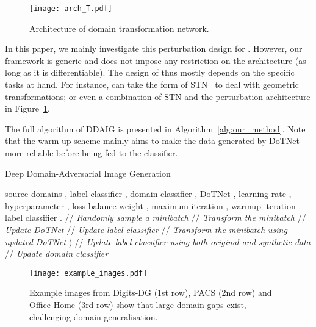 \documentclass[letterpaper]{article}
\begin{document}
\begin{figure}[t]
    \centering
    \texttt{[image: arch\_T.pdf]}
    \caption{\small Architecture of domain transformation network.}
    \label{fig:arch_T}
    \vspace{-0.4cm}
\end{figure}

In this paper, we mainly investigate this perturbation design for . However, our framework is generic and does not impose any restriction on the architecture  (as long as it is differentiable). The design of  thus mostly depends on the specific tasks at hand.
For instance,  can take the form of STN~\cite{nips15stn} to deal with geometric transformations; or even a combination of STN and the perturbation architecture in  Figure~\ref{fig:arch_T}.

The full algorithm of DDAIG is presented in Algorithm~\ref{alg:our_method}. Note that the warm-up scheme mainly aims to make the data generated by DoTNet more reliable before being fed to the classifier.

\begin{algorithm}[t]
   \caption{Deep Domain-Adversarial Image Generation}
   \label{alg:our_method}
   \footnotesize
\begin{algorithmic}[1]  source domains , label classifier , domain classifier , DoTNet , learning rate , hyperparameter , loss balance weight , maximum iteration , warmup iteration .
    label classifier .
     \STATE  \hfill // \textit{Randomly sample a minibatch}
     \STATE  \hfill // \textit{Transform the minibatch}
     \STATE  \hfill // \textit{Update DoTNet}
     \IF{}
         \STATE  \hfill // \textit{Update label classifier}
     \ELSE
         \STATE  \hfill // \textit{Transform the minibatch using updated DoTNet}
         \STATE ) \hfill // \textit{Update label classifier using both original and synthetic data}
     \ENDIF
     \STATE  \hfill // \textit{Update domain classifier}
   \ENDFOR
\end{algorithmic}
\end{algorithm}



\begin{figure}[t]
    \centering
    \texttt{[image: example\_images.pdf]}
    \caption{\small 
    Example images from Digits-DG (1st row), PACS (2nd row) and Office-Home (3rd row) show that large domain gaps exist, challenging domain generalisation.
    }
    \label{fig:example_images}
    \vspace{-0.4cm}
\end{figure}
\end{document}
